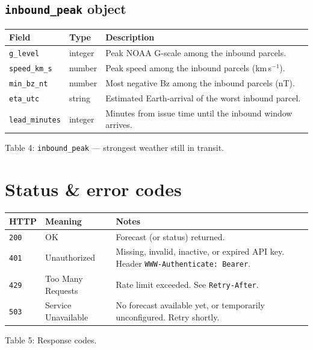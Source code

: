 \documentclass[11pt,a4paper]{article}
\newcommand{\tc}[1]{\texttt{#1}}
\begin{document}
\subsection{\tc{inbound\_peak} object}
\begin{tabularx}{\textwidth}{@{}l l X@{}}
\toprule
\rowcolor{tablehead}\textbf{Field} & \textbf{Type} & \textbf{Description}\\
\midrule
\tc{g\_level} & integer & Peak NOAA G-scale among the inbound parcels.\\
\tc{speed\_km\_s} & number & Peak speed among the inbound parcels (km\,s$^{-1}$).\\
\tc{min\_bz\_nt} & number & Most negative Bz among the inbound parcels (nT).\\
\tc{eta\_utc} & string & Estimated Earth-arrival of the worst inbound parcel.\\
\tc{lead\_minutes} & integer & Minutes from issue time until the inbound window arrives.\\
\bottomrule
\end{tabularx}
\begin{center}\small Table 4: \tc{inbound\_peak} --- strongest weather still in transit.\end{center}

\section{Status \& error codes}\label{sec:errors}

\begin{tabularx}{\textwidth}{@{}l l X@{}}
\toprule
\rowcolor{tablehead}\textbf{HTTP} & \textbf{Meaning} & \textbf{Notes}\\
\midrule
\tc{200} & OK & Forecast (or status) returned.\\
\tc{401} & Unauthorized & Missing, invalid, inactive, or expired API key. Header \tc{WWW-Authenticate: Bearer}.\\
\tc{429} & Too Many Requests & Rate limit exceeded. See \tc{Retry-After}.\\
\tc{503} & Service Unavailable & No forecast available yet, or temporarily unconfigured. Retry shortly.\\
\bottomrule
\end{tabularx}
\begin{center}\small Table 5: Response codes.\end{center}
\end{document}
